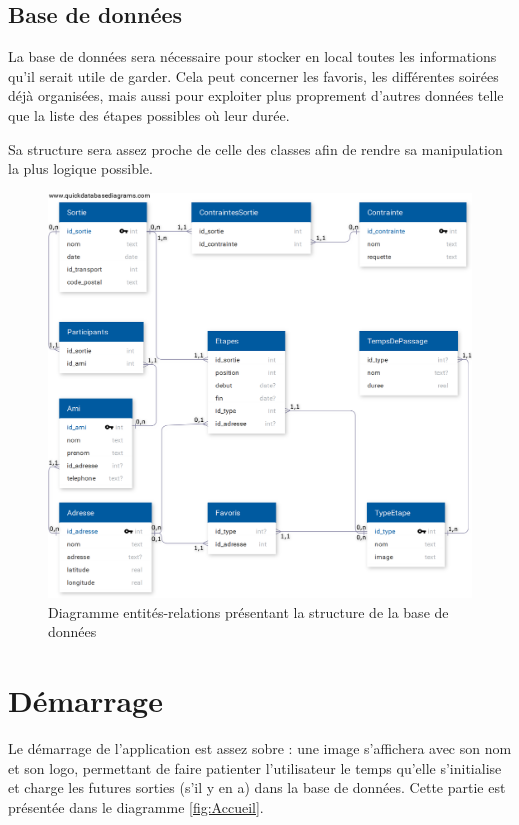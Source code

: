 \documentclass[a4paper, 12pt, notitlepage]{article} %
\begin{document}
\subsection{Base de données}
La base de données sera nécessaire pour stocker en local toutes les informations qu'il serait utile de garder. Cela peut concerner les favoris, les différentes soirées déjà organisées, mais aussi pour exploiter plus proprement d'autres données telle que la liste des étapes possibles où leur durée.

Sa structure sera assez proche de celle des classes afin de rendre sa manipulation la plus logique possible.

\vfill
\begin{figure}[!htb]
    \centering
    \includegraphics[width=1\textwidth]{DB_cardinal.png}
    \caption[Diagramme entités-relations]{Diagramme entités-relations présentant la structure de la base de données}
    \label{fig:BD}
\end{figure}
\vfill
\clearpage



\section{Démarrage}
Le démarrage de l'application est assez sobre : une image s'affichera avec son nom et son logo, permettant de faire patienter l'utilisateur le temps qu'elle s’initialise et charge les futures sorties (s'il y en a) dans la base de données.
Cette partie est présentée dans le diagramme \ref{fig:Accueil}.
\end{document}
